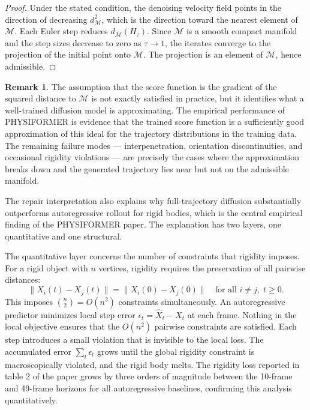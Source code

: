 \documentclass[12pt,oneside]{article}
\theoremstyle{definition}
\newtheorem{remark}[theorem]{Remark}
\newcommand{\Mca}{\mathcal{M}}
\begin{document}
\begin{proof}
Under the stated condition, the denoising velocity field points in the direction of
decreasing \(d_\Mca^2\), which is the direction toward the nearest element of \(\Mca\).
Each Euler step reduces \(d_\Mca(H_\tau)\). Since \(\Mca\) is a smooth compact manifold
and the step sizes decrease to zero as \(\tau \to 1\), the iterates converge to the
projection of the initial point onto \(\Mca\). The projection is an element of \(\Mca\),
hence admissible.
\end{proof}

\begin{remark}
The assumption that the score function is the gradient of the squared distance to \(\Mca\)
is not exactly satisfied in practice, but it identifies what a well-trained diffusion model
is approximating. The empirical performance of PHYSIFORMER is evidence that the trained
score function is a sufficiently good approximation of this ideal for the trajectory
distributions in the training data. The remaining failure modes --- interpenetration,
orientation discontinuities, and occasional rigidity violations --- are precisely the
cases where the approximation breaks down and the generated trajectory lies near but not
on the admissible manifold.
\end{remark}

The repair interpretation also explains why full-trajectory diffusion substantially
outperforms autoregressive rollout for rigid bodies, which is the central empirical
finding of the PHYSIFORMER paper. The explanation has two layers, one quantitative
and one structural.

The quantitative layer concerns the number of constraints that rigidity imposes.
For a rigid object with \(n\) vertices, rigidity requires the preservation of all
pairwise distances:
\[
\|X_i(t) - X_j(t)\| = \|X_i(0) - X_j(0)\| \quad \text{for all } i \neq j, \; t \geq 0.
\]
This imposes \(\binom{n}{2} = O(n^2)\) constraints simultaneously. An autoregressive
predictor minimizes local step error \(\epsilon_t = \hat{X}_t - X_t\) at each frame.
Nothing in the local objective ensures that the \(O(n^2)\) pairwise constraints are
satisfied. Each step introduces a small violation that is invisible to the local
loss. The accumulated error \(\sum_t \epsilon_t\) grows until the global
rigidity constraint is macroscopically violated, and the rigid body melts. The
rigidity loss reported in table 2 of the paper grows by three orders of magnitude
between the 10-frame and 49-frame horizons for all autoregressive baselines,
confirming this analysis quantitatively.
\end{document}
